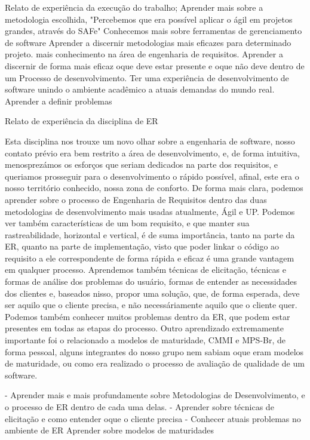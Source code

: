 Relato de experiência da execução do trabalho;
  Aprender mais sobre a metodologia escolhida, "Percebemos que era possível aplicar o ágil em projetos grandes, através do SAFe"
  Conhecemos mais sobre ferramentas de gerenciamento de software
  Aprender a discernir metodologias mais eficazes para determinado projeto.
  mais conhecimento na área de engenharia de requisitos.
  Aprender a discernir de forma mais eficaz oque deve estar presente e oque não deve dentro de um Processo de desenvolvimento.
  Ter uma experiência de desenvolvimento de software unindo o ambiente acadêmico a atuais demandas do mundo real.
  Aprender a definir problemas

Relato de experiência da disciplina de ER

Esta disciplina nos trouxe um novo olhar sobre a engenharia de software,
nosso contato prévio era bem restrito a área de desenvolvimento, e, de forma intuitiva, menosprezámos os esforços
que seriam dedicados na parte dos requisitos, e queriamos prosseguir para o desenvolvimento o rápido possível,
afinal, este era o nosso território conhecido, nossa zona de conforto.
De forma mais clara, podemos aprender sobre o processo de Engenharia de Requisitos dentro das duas metodologias
de desenvolvimento mais usadas atualmente, Ágil e UP.
Podemos ver também características de um bom requisito, e que manter sua rastreabilidade, horizontal e vertical,
é de suma importância, tanto na parte da ER, quanto na parte de implementação, visto que poder linkar o código
ao requisito a ele correspondente de forma rápida e eficaz é uma grande vantagem em qualquer processo.
Aprendemos também técnicas de elicitação, técnicas e formas de análise dos problemas do usuário,
formas de entender as necessidades dos clientes e, baseados nisso, propor uma solução, que, de forma esperada,
deve ser aquilo que o cliente precisa, e não necessáriamente aquilo que o cliente quer.
Podemos também conhecer muitos problemas dentro da ER, que podem estar presentes em todas as etapas do processo.
Outro aprendizado extremamente importante foi o relacionado a modelos de maturidade, CMMI e MPS-Br, de forma pessoal,
alguns integrantes do nosso grupo nem sabiam oque eram modelos de maturidade, ou como era realizado o processo de
avaliação de qualidade de um software.

 -  Aprender mais e mais profundamente sobre Metodologias de Desenvolvimento, e o processo de ER dentro de cada uma delas.
 -  Aprender sobre técnicas de elicitação e como entender oque o cliente precisa
 - Conhecer atuais problemas no ambiente de ER
  Aprender sobre modelos de maturidades
